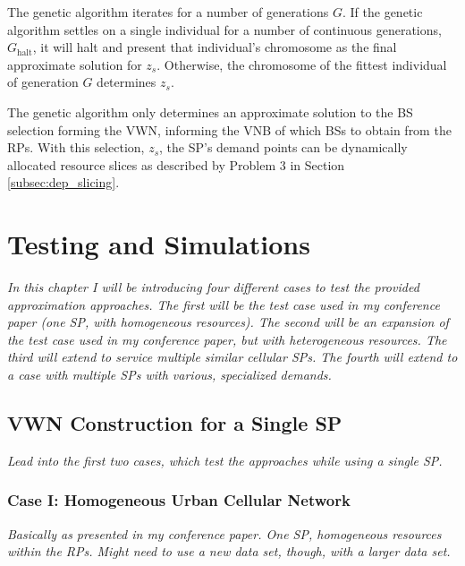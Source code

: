 \documentclass[12pt,dvipsnames]{report}
\begin{document}
The genetic algorithm iterates for a number of generations $G$.  If the genetic algorithm settles on a single individual for a number of continuous generations, $G_\text{halt}$, it will halt and present that individual's chromosome as the final approximate solution for $z_s$.  Otherwise, the chromosome of the fittest individual of generation $G$ determines $z_s$.

The genetic algorithm only determines an approximate solution to the BS selection forming the VWN, informing the VNB of which BSs to obtain from the RPs.  With this selection, $z_s$, the SP's demand points can be dynamically allocated resource slices as described by Problem 3 in Section \ref{subsec:dep_slicing}.
\fi

\iftrue
\pagebreak
\chapter{Testing and Simulations} \label{ch:testsim}


\textit{In this chapter I will be introducing four different cases to test the provided approximation approaches.  The first will be the test case used in my conference paper (one SP, with homogeneous resources).  The second will be an expansion of the test case used in my conference paper, but with heterogeneous resources.  The third will extend to service multiple similar cellular SPs.  The fourth will extend to a case with multiple SPs with various, specialized demands.}

\section{VWN Construction for a Single SP} \label{sec:onesp}

\textit{Lead into the first two cases, which test the approaches while using a single SP.}

\subsection{Case I: Homogeneous Urban Cellular Network} \label{subsec:onesp_homres}


\textit{Basically as presented in my conference paper.  One SP, homogeneous resources within the RPs.  Might need to use a new data set, though, with a larger data set.}
\end{document}
